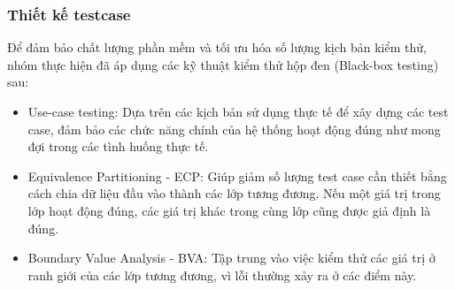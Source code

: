 \subsubsection{Thiết kế testcase}
Để đảm bảo chất lượng phần mềm và tối ưu hóa số lượng kịch bản kiểm thử, nhóm thực hiện đã áp dụng các kỹ thuật kiểm thử hộp đen (Black-box testing) sau:
\begin{itemize}
    \item Use-case testing: Dựa trên các kịch bản sử dụng thực tế để xây dựng các test case, đảm bảo các chức năng chính của hệ thống hoạt động đúng như mong đợi trong các tình huống thực tế.
    \item Equivalence Partitioning - ECP: Giúp giảm số lượng test case cần thiết bằng cách chia dữ liệu đầu vào thành các lớp tương đương. Nếu một giá trị trong lớp hoạt động đúng, các giá trị khác trong cùng lớp cũng được giả định là đúng.
    \item Boundary Value Analysis - BVA: Tập trung vào việc kiểm thử các giá trị ở ranh giới của các lớp tương đương, vì lỗi thường xảy ra ở các điểm này.
\end{itemize}

